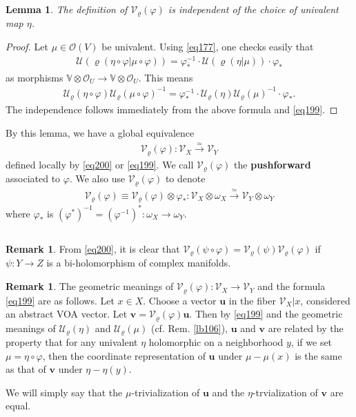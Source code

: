 \documentclass[11pt,b5paper,notitlepage]{article}
\theoremstyle{definition}
\newtheorem{rem}[df]{Remark}
\theoremstyle{plain}
\newtheorem{lm}[df]{Lemma}
\newcommand{\mc}{\mathcal}
\newcommand{\scr}{\mathscr}
\newcommand{\Vbb}{\mathbb V}
\newcommand{\vbf}{\mathbf v}
\newcommand{\ubf}{\mathbf u}
\numberwithin{equation}{section}
\begin{document}
\begin{lm}
The definition of $\mc V_\varrho(\varphi)$ is independent of the choice of univalent map $\eta$.
\end{lm}

\begin{proof}
Let $\mu\in\scr O(V)$ be univalent. Using \eqref{eq177}, one checks easily that
\begin{align*}
\mc U(\varrho(\eta\circ\varphi|\mu\circ\varphi))=\varphi^{-1}_*\cdot\mc U(\varrho(\eta|\mu))\cdot\varphi_*
\end{align*}
as morphisms $\Vbb\otimes\scr O_U\rightarrow\Vbb\otimes\scr O_U$. This means
\begin{align}
\mc U_\varrho(\eta\circ\varphi)\mc U_\varrho(\mu\circ\varphi)^{-1}=\varphi^{-1}_*\cdot\mc U_\varrho(\eta)\mc U_\varrho(\mu)^{-1}\cdot\varphi_*.
\end{align}
The independence follows immediately from the above formula and \eqref{eq199}.
\end{proof}

By this lemma, we have a global equivalence
\begin{align}
\mc V_\varrho(\varphi):\scr V_X\xrightarrow{\simeq}\scr V_Y
\end{align}
defined locally by \eqref{eq200} or \eqref{eq199}. We call $\mc V_\varrho(\varphi)$ the \textbf{pushforward} associated to $\varphi$. We also use $\mc V_\varrho(\varphi)$ to denote
\begin{align}
\mc V_\varrho(\varphi)\equiv \mc V_\varrho(\varphi)\otimes\varphi_*:\scr V_X\otimes\omega_X\xrightarrow{\simeq}\scr V_Y\otimes\omega_Y\label{eq206}
\end{align}
where $\varphi_*$ is  $(\varphi^*)^{-1}=(\varphi^{-1})^*:\omega_X\rightarrow\omega_Y$.

\subsection{}


\begin{rem}
From \eqref{eq200}, it is clear that $\mc V_\varrho(\psi\circ\varphi)=\mc V_\varrho(\psi)\mc V_\varrho(\varphi)$ if $\psi:Y\rightarrow Z$ is a bi-holomorphism of complex manifolds.
\end{rem}

\begin{rem}\label{lb107}
The geometric meanings of $\mc V_\varrho(\varphi):\scr V_X\rightarrow\scr V_Y$ and the formula \eqref{eq199} are as follows. Let $x\in X$. Choose a vector $\ubf$ in the fiber $\scr V_X|x$, considered an abstract VOA vector. Let $\vbf=\mc V_\varrho(\varphi)\ubf$. Then by \eqref{eq199} and the geometric meanings of $\mc U_\varrho(\eta)$ and $\mc U_\varrho(\mu)$ (cf. Rem. \ref{lb106}), $\ubf$ and $\vbf$ are related by the property that for any univalent $\eta$ holomorphic on a neighborhood $y$, if we set $\mu=\eta\circ\varphi$, then  the coordinate representation of $\ubf$ under $\mu-\mu(x)$ is the same as that of $\vbf$ under $\eta-\eta(y)$. 

We will simply say that the $\mu$-trivialization of $\ubf$ and the $\eta$-trvialization of $\vbf$ are equal.
\end{rem}
\end{document}
